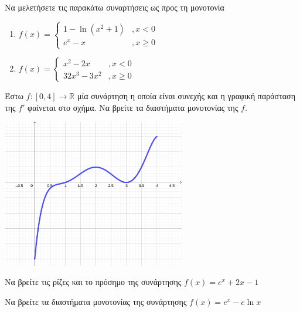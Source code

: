 \documentclass{presentation}
\begin{document}
\begin{askisi}
    Να μελετήσετε τις παρακάτω συναρτήσεις ως προς τη μονοτονία
    \begin{enumerate}
        \item<1-> $f(x)=\begin{cases}
                    1-\ln (x^2+1) & ,x<0    \\
                    e^x-x         & ,x\ge 0
                \end{cases}$
        \item<2-> $f(x)=\begin{cases}
                    x^2-2x     & ,x<0    \\
                    32x^3-3x^2 & ,x\ge 0
                \end{cases}$
    \end{enumerate}

\end{askisi}

\begin{askisi}
    Έστω $f:[0,4]\to\mathbb{R}$ μία συνάρτηση η οποία είναι συνεχής και η γραφική παράσταση της $f'$ φαίνεται στο σχήμα. Να βρείτε τα διαστήματα μονοτονίας της $f$.

    \centering
    \includegraphics[width=0.6\textwidth]{"images/2.6.2 Μονοτονία.png"}

\end{askisi}

\begin{askisi}
    Να βρείτε τις ρίζες και το πρόσημο της συνάρτησης $f(x)=e^x+2x-1$

\end{askisi}

\begin{askisi}
    Να βρείτε τα διαστήματα μονοτονίας της συνάρτησης $f(x)=e^x-e\ln x$

\end{askisi}
\end{document}
